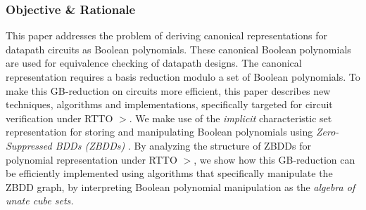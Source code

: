 \subsubsection{Objective \& Rationale} This paper addresses the
problem of deriving canonical representations for datapath circuits
as Boolean polynomials. These canonical Boolean polynomials are
used for equivalence checking of datapath designs. The canonical
representation requires a \Grobner basis reduction modulo a set of
Boolean polynomials. 
To make this GB-reduction
on circuits more efficient, this paper describes new techniques,
algorithms and implementations, specifically targeted for 
circuit verification under RTTO $>$.  We make use of
the {\it implicit} characteristic set representation for storing and
manipulating Boolean polynomials using {\it Zero-Suppressed BDDs
(ZBDDs)} \cite{zbdd}. By analyzing the {structure of ZBDDs} for 
polynomial representation under RTTO $>$, we show how this 
GB-reduction can be efficiently implemented using algorithms that
specifically manipulate the ZBDD graph, by interpreting Boolean
polynomial manipulation as the {\it algebra of unate cube sets.}

